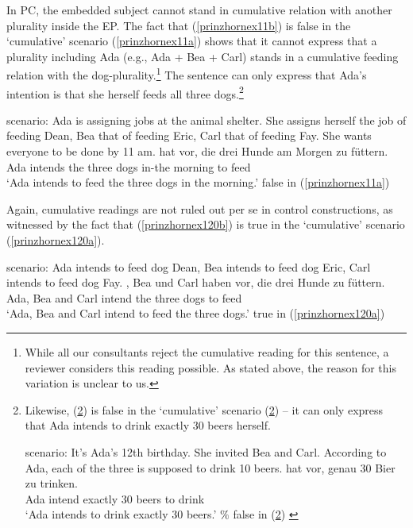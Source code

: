 \documentclass[output=paper,colorlinks,citecolor=brown,
]{langscibook}
\begin{document}
In PC, the embedded subject cannot stand in cumulative relation with another plurality inside the EP. The fact that (\ref{prinzhornex11b}) is false in the `cumulative' scenario (\ref{prinzhornex11a}) shows that it cannot express that a plurality including Ada (e.g., Ada + Bea + Carl) stands in a cumulative feeding relation with the dog-plurality.\footnote{While all our consultants reject the cumulative reading for this sentence, a reviewer considers this reading possible. As stated above, the reason for this variation is unclear to us.} The sentence can only express that Ada's intention is that she herself feeds all three dogs.\footnote{Likewise, (\ref{prinzhornex12b}) is false in the `cumulative' scenario (\ref{prinzhornex12a}) -- it can only express that Ada intends to drink exactly 30 beers herself. 

\ea 
\ea \label{prinzhornex12a} {\sc scenario: } It's Ada's 12th birthday. She invited Bea and Carl. According to Ada, each of the three is supposed to drink 10 beers.
\ex {} {hat} {vor}, {genau} {30} {Bier} {zu} {trinken}.\\
   Ada intend {} exactly 30 beers to drink \\
   \glt `Ada intends to drink exactly 30 beers.' \hfill {$\%$ false} in (\ref{prinzhornex12a})  \label{prinzhornex12b}
\z \z

}

\ea \label{prinzhornex11}
\ea \label{prinzhornex11a} {\sc scenario:} Ada is assigning jobs at the animal shelter. She assigns herself the job of feeding Dean,  Bea that of feeding  Eric,  Carl that of feeding  Fay. She wants everyone to be done by 11 am. 
\ex {} {hat vor}, {die} {drei} {Hunde} {am} {Morgen} {zu} {füttern}.\\
   Ada intends  the three dogs in-the morning to feed \\
   \glt `Ada intends to feed the three dogs in the morning.' \hfill {false} in (\ref{prinzhornex11a}) \label{prinzhornex11b}
\z \z

Again, cumulative readings are not ruled out per se in control constructions, as witnessed by the fact that (\ref{prinzhornex120b}) is true in the `cumulative' scenario (\ref{prinzhornex120a}).

\ea \label{prinzhornex120}
\ea \label{prinzhornex120a} {\sc scenario: }  Ada intends to feed dog Dean, Bea intends to feed dog Eric, Carl intends to feed dog Fay.
\ex {}, {Bea} {und} {Carl} {haben vor}, {die} {drei} {Hunde}  {zu} {füttern}.\\
   Ada, Bea and Carl intend  the three dogs  to feed \\
   \glt `Ada, Bea and Carl intend to feed the three dogs.' \hfill {true} in (\ref{prinzhornex120a}) \label{prinzhornex120b}
\z \z
\end{document}
